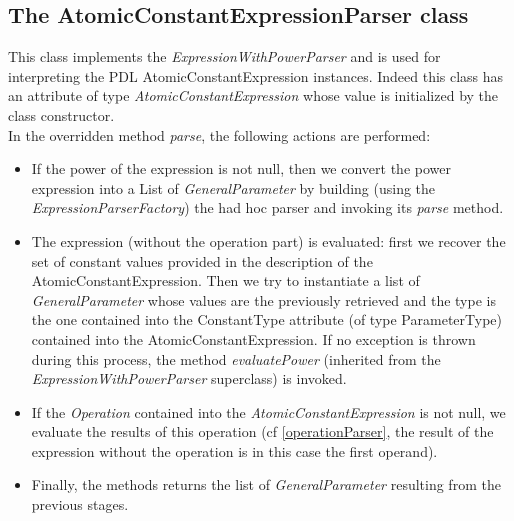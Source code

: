 \documentclass[a4paper,11pt] {ivoa}
\begin{document}
\subsection{The AtomicConstantExpressionParser class}
This class implements the {\it ExpressionWithPowerParser} and is used for interpreting the PDL {AtomicConstantExpression} instances. Indeed this class has an attribute of type {\it AtomicConstantExpression} whose value is initialized by the class constructor.\\
In the overridden method {\it parse}, the following actions are performed:
\begin{itemize}
\item If the power of the expression is not null, then we convert the power expression into a List of {\it GeneralParameter} by building (using the {\it ExpressionParserFactory}) the had hoc parser and invoking its {\it parse} method.
\item The expression (without the operation part) is evaluated: first we recover the set of constant values provided in the description of  the AtomicConstantExpression. Then we try to instantiate a list of {\it GeneralParameter} whose values are the previously retrieved and the type is the one contained into the ConstantType attribute (of type ParameterType) contained into the AtomicConstantExpression. If no exception is thrown during this process, the method {\it evaluatePower} (inherited from the {\it ExpressionWithPowerParser} superclass) is invoked.
\item If the {\it Operation} contained into the {\it AtomicConstantExpression} is not null, we evaluate the results of this operation (cf \ref{operationParser}, the result of the expression without the operation is in this case the first operand).
\item Finally, the methods returns the list of {\it GeneralParameter} resulting from the previous stages.
\end{itemize}
\end{document}
